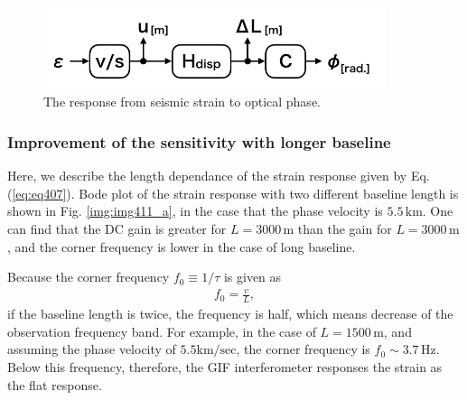 \begin{figure}[h]
  \centering
  \includegraphics[width=10.0cm]{./img_chap4/img411.png}
  \caption{The response from seismic strain to optical phase.} \label{img:img411}
\end{figure}

\subsubsection{Improvement of the sensitivity with longer baseline}
Here, we describe the length dependance of the strain response given by Eq.(\ref{eq:eq407}). Bode plot of the strain response with two different baseline length is shown in Fig. \ref{img:img411_a}, in the case that the phase velocity is $5.5\,\mathrm{km}$. One can find that the DC gain is greater for $L=3000\,\mathrm{m}$ than the gain for $L=3000\,\mathrm{m}$, and the corner frequency is lower in the case of long baseline.

Because the corner frequency $f_0\equiv {1}/{\tau}$ is given as
\begin{eqnarray}
  f_0 = \frac{v}{L},
\end{eqnarray}
if the baseline length is twice, the frequency is half, which means decrease of the observation frequency band. For example, in the case of $L=1500\,\mathrm{m}$, and assuming the phase velocity of $5.5 \mathrm{km/sec}$, the corner frequency is $f_0\sim3.7\,\mathrm{Hz}$. Below this frequency, therefore, the GIF interferometer responses the strain as the flat response.

